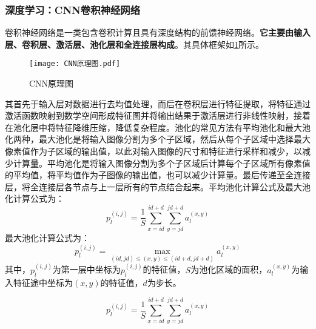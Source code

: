 \documentclass{MathorCupmodeling}
\begin{document}
	\subsubsection{深度学习：CNN卷积神经网络}
	卷积神经网络是一类包含卷积计算且具有深度结构的前馈神经网络。\textbf{它主要由输入层、卷积层、激活层、池化层和全连接层构成}\textcolor{blue}{\cite{李莎}}。其具体框架如\textcolor{blue}{\cref{fig:CNN原理图}}所示。
	\begin{figure}[H]
		\centering
		\texttt{[image: CNN原理图.pdf]}
		\caption{CNN原理图}
		\label{fig:CNN原理图}
	\end{figure}

	其首先于输入层对数据进行去均值处理，而后在卷积层进行特征提取，将特征通过激活函数映射到数学空间形成特征图并将输出结果于激活层进行非线性映射\textcolor{blue}{\cite{孟琪琳}}，接着在池化层中将特征降维压缩，降低复杂程度。池化的常见方法有平均池化和最大池化两种，最大池化是将输入图像分割为多个子区域，然后从每个子区域中选择最大像素值作为子区域的输出值，以此对输入图像的尺寸和特征进行采样和减少，以减少计算量。平均池化是将输入图像分割为多个子区域后计算每个子区域所有像素值的平均值，将平均值作为子图像的输出值，也可以减少计算量\textcolor{blue}{\cite{刘幸倩}}。最后传递至全连接层，将全连接层各节点与上一层所有的节点结合起来。平均池化计算公式及最大池化计算公式为：
	\begin{equation}
		p_{l}^{\left( i,j \right)}=\frac{1}{S}\sum_{x=id}^{id+d}{\sum_{y=jd}^{jd+d}{a_{l}^{\left( x,y \right)}}}
	\end{equation}
	最大池化计算公式为：
	\begin{equation}
		p_{l}^{\left( i,j \right)}=\underset{\left( id,jd \right) \leqslant \left( x,y \right) \leqslant \left( id+d,jd+d \right)}{\max}a_{l}^{\left( x,y \right)}
	\end{equation}
	其中，$p_{l}^{\left( i,j \right)}$为第一层中坐标为$p_{l}^{\left( i,j \right)}$的特征值，$S$为池化区域的面积，$a_{l}^{\left( x,y \right)}$为输入特征途中坐标为$\left( x,y \right)$的特征值，$d$为步长。

	\begin{equation}
		p_{l}^{\left( i,j \right)}=\frac{1}{S}\sum_{x=id}^{id+d}{\sum_{y=jd}^{jd+d}{a_{l}^{\left( x,y \right)}}}
	\end{equation}
\end{document}
